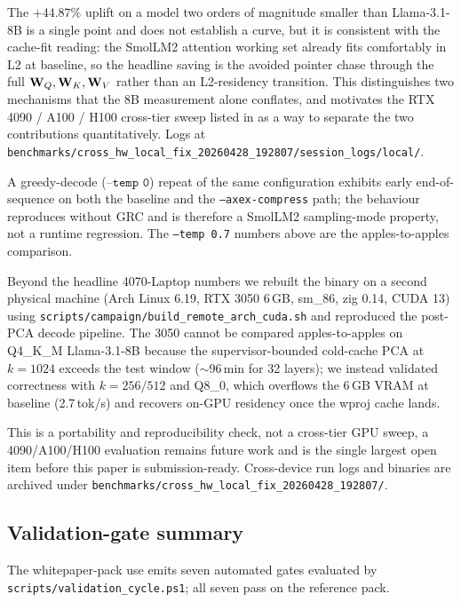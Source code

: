 \documentclass[11pt]{article}
\begin{document}
The $+44.87\%$ uplift on a model two orders of magnitude smaller than
Llama-3.1-8B is a single point and does not establish a curve, but it is
consistent with the cache-fit reading: the SmolLM2 attention working set
already fits comfortably in L2 at baseline, so the headline saving is
the avoided pointer chase through the full $\mathbf{W}_Q,\mathbf{W}_K,\mathbf{W}_V$
rather than an L2-residency transition. This distinguishes two
mechanisms that the 8B measurement alone conflates, and motivates the
RTX 4090 / A100 / H100 cross-tier sweep listed in
 as a way to separate the two contributions
quantitatively. Logs at
\texttt{benchmarks/cross\_hw\_local\_fix\_20260428\_192807/session\_logs/local/}.

A greedy-decode ($\texttt{--temp 0}$) repeat of the same configuration
exhibits early end-of-sequence on both the baseline and the
\texttt{--axex-compress} path; the behaviour reproduces without GRC and
is therefore a SmolLM2 sampling-mode property, not a runtime regression.
The \texttt{--temp 0.7} numbers above are the apples-to-apples
comparison.

\label{sec:second-device}

Beyond the headline 4070-Laptop numbers we rebuilt the binary on a
second physical machine (Arch Linux 6.19, RTX 3050 6\,GB, sm\_86, zig
0.14, CUDA 13) using \texttt{scripts/campaign/build\_remote\_arch\_cuda.sh}
and reproduced the post-PCA decode pipeline. The 3050 cannot be compared
apples-to-apples on Q4\_K\_M Llama-3.1-8B because the supervisor-bounded
cold-cache PCA at $k{=}1024$ exceeds the test window ($\sim$96\,min for 32
layers); we instead validated correctness with $k{=}256/512$ and Q8\_0,
which overflows the 6\,GB VRAM at baseline (2.7\,tok/s) and recovers
on-GPU residency once the wproj cache lands.

This is a portability and reproducibility check, not a cross-tier
GPU sweep, a 4090/A100/H100 evaluation remains future work and is the
single largest open item before this paper is submission-ready.
Cross-device run logs and binaries are archived under
\texttt{benchmarks/cross\_hw\_local\_fix\_20260428\_192807/}.

\subsection{Validation-gate summary}

The whitepaper-pack use emits seven automated gates evaluated by
\texttt{scripts/validation\_cycle.ps1}; all seven pass on the reference pack.
\end{document}
